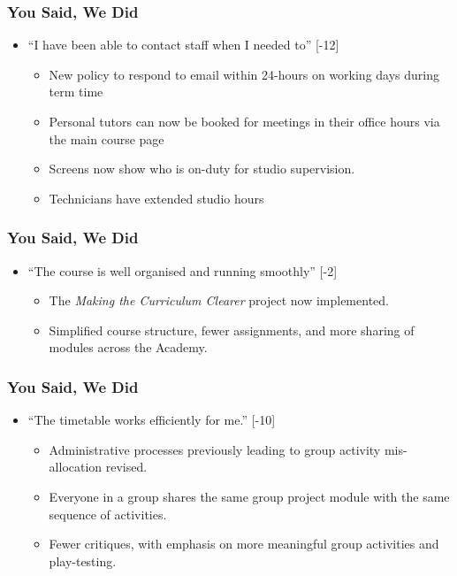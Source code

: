 \begin{frame}
	\frametitle{You Said, We Did}
			
	\begin{itemize}
		
		\item ``I have been able to contact staff when I needed to'' [-12]
		\begin{itemize}
			\item New policy to respond to email within 24-hours on working days during term time 
			\item Personal tutors can now be booked for meetings in their office hours via the main course page
			\item Screens now show who is on-duty for studio supervision. 
			\item Technicians have extended studio hours
		\end{itemize}		
		
	\end{itemize}
\end{frame}

\begin{frame}
	\frametitle{You Said, We Did}
		
	\begin{itemize}
	
			\item ``The course is well organised and running smoothly'' [-2]
		\begin{itemize}
			\item The \textit{Making the Curriculum Clearer} project now implemented.
			\item Simplified course structure, fewer assignments, and more sharing of modules across the Academy.
		\end{itemize}
		
	\end{itemize}
\end{frame}

\begin{frame}
	\frametitle{You Said, We Did}
		
	\begin{itemize}
		
		\pause\item ``The timetable works efficiently for me.'' [-10]
		\begin{itemize}
			\item Administrative processes previously leading to group activity mis-allocation revised.
			\item Everyone in a group shares the same group project module with the same sequence of activities.
			\item Fewer critiques, with emphasis on more meaningful group activities and play-testing.
		\end{itemize}
		
	\end{itemize}
\end{frame}

